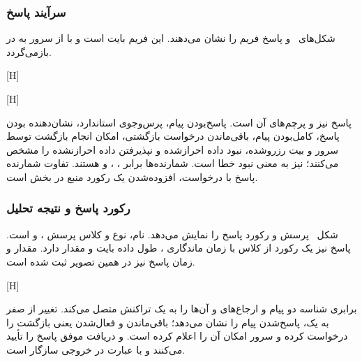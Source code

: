 \subsubsection{سرآیند پاسخ}

شکل‌های~ و
 پاسخ فریم  را نشان می‌دهند. این فریم
 بایت است و با  از  سرور به  در  بازمی‌گردد.

[H]

[H]

 پاسخ نیز  و پرچم‌های آن  است.  پاسخ‌بودن
پیام،  پرس‌وجوی استاندارد،  نشان‌دهنده  بودن پاسخ،
 کامل‌بودن پیام،  باقی‌ماندن درخواست
بازگشتی،  امکان انجام بازگشت توسط سرور و
 بیت رزروشده،  نبود داده احرازشده و  نپذیرفتن داده احرازنشده
را مشخص می‌کنند؛  نیز به معنی نبود خطا است. شمارنده‌ها برابر ،
،  و  هستند. تفاوت شمارنده
پاسخ با درخواست، افزوده‌شدن یک رکورد منبع در بخش  است.

\subsubsection{رکورد پاسخ و نتیجه تحلیل}

شکل~ پرسش و رکورد پاسخ را نمایش می‌دهد. نام، نوع و کلاس پرسش
،  و  است. پاسخ نیز یک رکورد  از کلاس  با
زمان ماندگاری ، طول داده  بایت و مقدار
 دارد. مقدار  و زمان پاسخ
 نیز در همین تصویر ثبت شده است.

[H]

برابری شناسه  دو پیام و ارجاع‌های  و  آن‌ها را
به یک تراکنش متصل می‌کند. تغییر  از صفر به یک، پاسخ‌شدن پیام را نشان می‌دهد؛ باقی‌ماندن
 و فعال‌شدن  یعنی  بازگشت را درخواست کرده و سرور امکان آن را اعلام کرده
است.  و  دریافت موفق پاسخ را تأیید می‌کنند و  با
عبارت  در خروجی  سازگار است.

